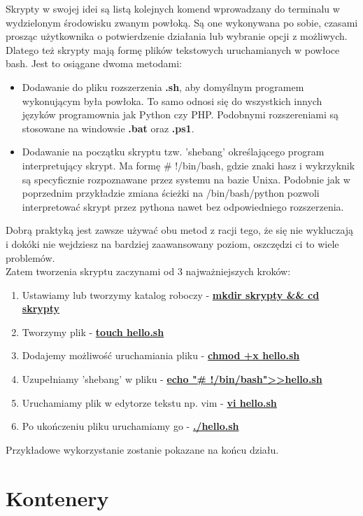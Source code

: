 \documentclass[10pt,a4paper]{report}
\begin{document}
Skrypty w swojej idei są listą kolejnych komend wprowadzany do terminalu w wydzielonym środowisku zwanym powłoką. Są one wykonywana po sobie, czasami prosząc użytkownika o potwierdzenie działania lub wybranie opcji z możliwych.\\
Dlatego też skrypty mają formę plików tekstowych uruchamianych w powłoce bash. Jest to osiągane dwoma metodami:
\begin{itemize}
\item Dodawanie do pliku rozszerzenia \textbf{.sh}, aby domyślnym programem wykonującym była powłoka. To samo odnosi się do wszystkich innych języków programownia jak Python czy PHP. Podobnymi rozszereniami są stosowane na windowsie \textbf{.bat} oraz \textbf{.ps1}.
\item Dodawanie na początku skryptu tzw. 'shebang' określającego program interpretujący skrypt. Ma formę \# !/bin/bash, gdzie znaki hasz i wykrzyknik są specyficznie rozpoznawane przez systemu na bazie Unixa. Podobnie jak w poprzednim przykładzie zmiana ścieżki na /bin/bash/python pozwoli interpretować skrypt przez pythona nawet bez odpowiedniego rozszerzenia.\\
\end{itemize}
Dobrą praktyką jest zawsze używać obu metod z racji tego, że się nie wykluczają i dokóki nie wejdziesz na bardziej zaawansowany poziom, oszczędzi ci to wiele problemów.\\
Zatem tworzenia skryptu zaczynami od 3 najważniejszych kroków:
\begin{enumerate}
\item Ustawiamy lub tworzymy katalog roboczy - \textbf{\underline{mkdir skrypty \&\&  cd skrypty }}
\item Tworzymy plik - \textbf{\underline{touch hello.sh}}
\item Dodajemy możliwość uruchamiania pliku - \textbf{\underline{chmod +x hello.sh}}
\item Uzupełniamy 'shebang' w pliku - \textbf{\underline{echo "\# !/bin/bash"\textgreater  \textgreater  hello.sh}}
\item Uruchamiamy plik w edytorze tekstu np. vim - \textbf{\underline{vi hello.sh}}
\item Po ukończeniu pliku uruchamiamy go - \textbf{\underline{./hello.sh}}\\
\end{enumerate}
Przykładowe wykorzystanie zostanie pokazane na końcu działu.
	\section{Kontenery}
	
\end{document}
